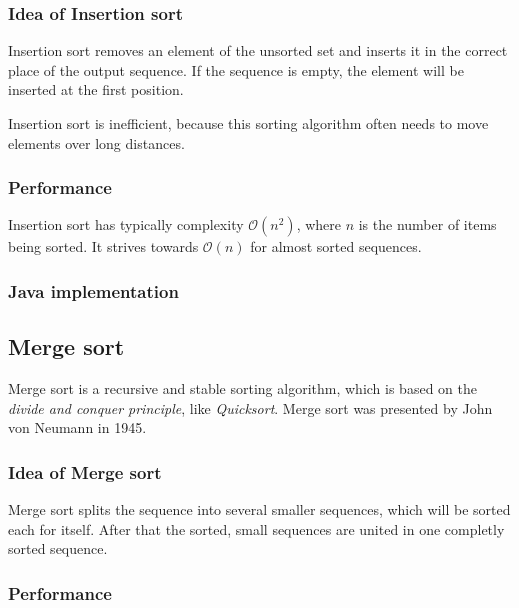 \documentclass[nobranding]{pfBook}
\newcommand{\OO}{\mathcal{O}}
\begin{document}
	\subsubsection{Idea of Insertion sort}
	
	Insertion sort removes an element of the unsorted set and inserts it in the correct place of the output sequence. If the sequence is empty, the element will be inserted at the first position.
	
	Insertion sort is inefficient, because this sorting algorithm often needs to move elements over long distances.
	
	\subsubsection{Performance}
	
	Insertion sort has typically complexity $\OO(n^2)$, where $n$ is the number of items being sorted. It strives towards $\OO(n)$ for almost sorted sequences.
	
	\subsubsection{Java implementation}
	
	
	
	\subsection{Merge sort}
	
	Merge sort is a recursive and stable sorting algorithm, which is based on the \emph{divide and conquer principle}, like \emph{Quicksort}. Merge sort was presented by John von Neumann in 1945.
	
	\subsubsection{Idea of Merge sort}
	
	Merge sort splits the sequence into several smaller sequences, which will be sorted each for itself. After that the sorted, small sequences are united in one completly sorted sequence.
	
	\subsubsection{Performance}
	
\end{document}
